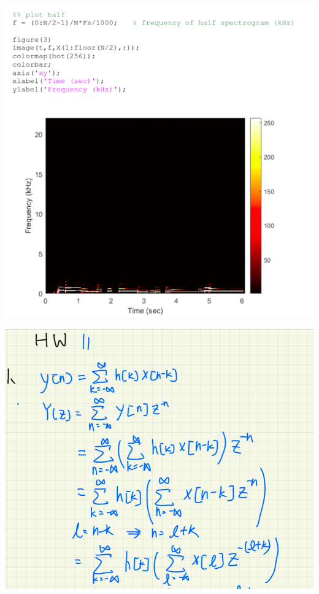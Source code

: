 \documentclass[a4paper]{article}
\begin{document}
	\begin{center}
		\includegraphics[width=1\linewidth]{screenshot106}
	\end{center}
	
	
	
	
	\newpage
	
	
	
	\begin{center}
		\includegraphics[width=1\linewidth]{screenshot107}
	\end{center}
	
\end{document}

